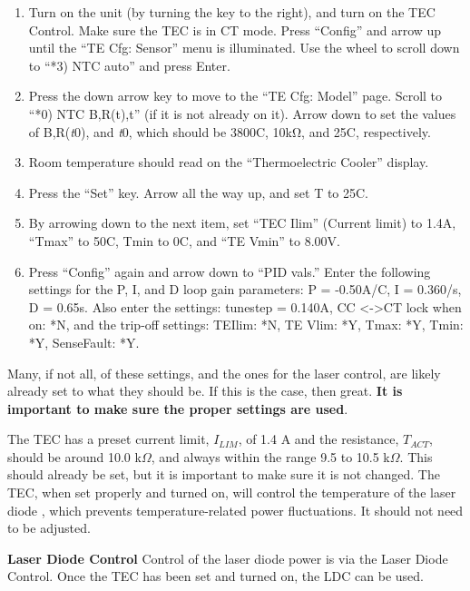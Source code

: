 \documentclass{../lab}
\begin{document}
\begin{enumerate}
    \item Turn on the unit (by turning the key to the right), and turn on the TEC Control. Make sure the TEC is in CT mode. Press ``Config'' and arrow up until the ``TE Cfg: Sensor'' menu is illuminated. Use the wheel to scroll down to ``*3) NTC auto'' and press Enter.

    \item Press the down arrow key to move to the ``TE Cfg: Model'' page. Scroll to ``*0) NTC Β,R(t),t'' (if it is not already on it). Arrow down to set the values of Β,R(\emph{t}0), and \emph{t}0, which should be 3800C, 10kΩ, and 25C, respectively.

    \item Room temperature should read on the ``Thermoelectric Cooler'' display.

    \item Press the ``Set'' key. Arrow all the way up, and set T to 25C.

    \item By arrowing down to the next item, set ``TEC Ilim'' (Current limit) to 1.4A, ``Tmax'' to 50C, Tmin to 0C, and ``TE Vmin'' to 8.00V.

    \item Press ``Config'' again and arrow down to ``PID vals.'' Enter the following settings for the P, I, and D loop gain parameters: P = -0.50A/C, I = 0.360/s, D = 0.65s. Also enter the settings: tunestep = 0.140A, CC <->CT lock when on: *N, and the trip-off settings: TEIlim: *N, TE Vlim: *Y, Tmax: *Y, Tmin: *Y, SenseFault: *Y.

\end{enumerate}

Many, if not all, of these settings, and the ones for the laser control, are likely already set to what they should be. If this is the case, then great. \textbf{It is important to make sure the proper settings are used}.

The TEC has a preset current limit, $ I_{LIM} $, of 1.4 A and the resistance, $ T_{ACT} $, should be around 10.0 k$ \Omega $, and always within the range 9.5 to 10.5 k$ \Omega $. This should already be set, but it is important to make sure it is not changed. The TEC, when set properly and turned on, will control the temperature of the laser diode , which prevents temperature-related power fluctuations. It should not need to be adjusted.

\textbf{Laser Diode Control} Control of the laser diode power is via the Laser Diode Control. Once the TEC has been set and turned on, the LDC can be used.
\end{document}
